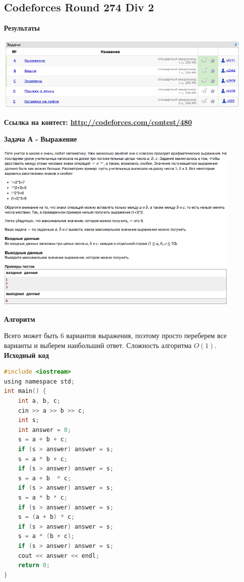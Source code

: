 \documentclass[a4paper,12pt]{article}
\begin{document}
\newpage
\subsection{Codeforces Round 274 Div 2}

\textbf{{\large Результаты}} \\
\begin{center}
\includegraphics[width=0.95\textwidth]{C_274/C_274_result.png}\\ [1cm]
\end{center}

\textbf{{\large Ссылка на контест: \url{http://codeforces.com/contest/480}}}

\newpage
\textbf{{\large Задача А - Выражение}}

\begin{center}
\includegraphics[width=0.9\textwidth]{C_274/C_274_A.png}\\ [1cm]
\end{center}

\textbf{{\large Алгоритм}}

Всего может быть 6 вариантов выражения, поэтому просто переберем все варианты и выберем наибольший ответ. Сложность алгоритма $O(1)$.\\

\textbf{{\large Исходный код}} \\
\begin{lstlisting}[language=C]
#include <iostream>
using namespace std;
int main() {
    int a, b, c;
    cin >> a >> b >> c;
    int s;
    int answer = 0;
    s = a + b + c;
    if (s > answer) answer = s;
    s = a * b + c;
    if (s > answer) answer = s;
    s = a + b  * c;
    if (s > answer) answer = s;
    s = a * b * c;
    if (s > answer) answer = s;
    s = (a + b) * c;
    if (s > answer) answer = s;
    s = a * (b + c);
    if (s > answer) answer = s;
    cout << answer << endl;
    return 0;
}
\end{lstlisting}
\end{document}
